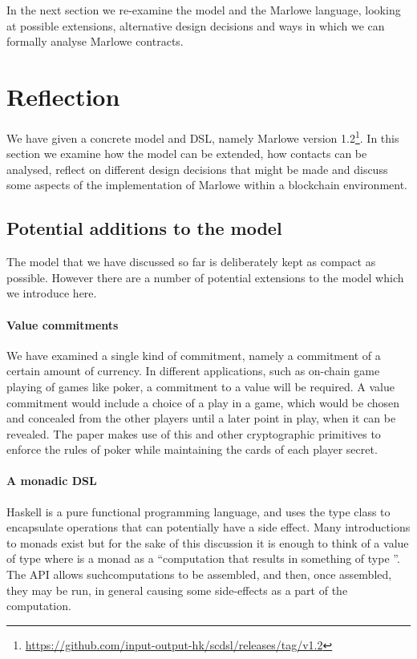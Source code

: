 \documentclass[
      acmsmall
    , screen
    , review=true
  ]{acmart}
\begin{document}
In the next section we re-examine the model and the Marlowe language, looking at possible extensions, alternative design decisions and ways in which we can formally analyse Marlowe contracts.

\section{Reflection}
\label{section:reflection}

We have given a concrete model and DSL, namely Marlowe version 
1.2\footnote{\url{https://github.com/input-output-hk/scdsl/releases/tag/v1.2}}.
In this section we examine how the model can be extended, how contacts can be analysed, reflect on different design 
decisions that might be made and discuss some aspects of the implementation of Marlowe within a blockchain environment.

\subsection{Potential additions to the model}

The model that we have discussed so far is deliberately kept as compact as possible. However there are a number of potential extensions to the model which we introduce here. 

\paragraph{Value commitments}

We have examined a single kind of commitment, namely a commitment of a certain amount of currency. In different 
applications, such as on-chain game playing of games like poker, a commitment to a value will be required. A value 
commitment would include a choice of a play in a game, which would be chosen and concealed from the other players until 
a later point in play, when it can be revealed. The paper \cite{kumaresan2015use} makes use of this and other 
cryptographic primitives to enforce the rules of poker while maintaining the cards of each player secret.

\paragraph{A monadic DSL}

Haskell is a pure functional programming language, and uses the  type class to encapsulate
operations that can potentially have a side effect. Many introductions to monads exist  but for the 
sake of this discussion it is enough to think of a value of type  where  is a monad 
as a ``computation that results in something of type ''. The  API allows 
suchcomputations to be assembled, and then, once assembled, they may be run, in general causing some side-effects as a 
part of the computation.
\end{document}
